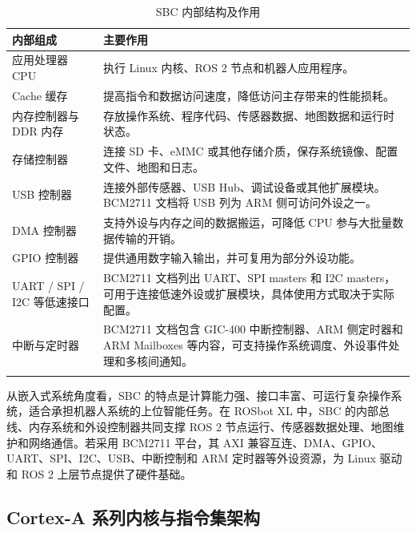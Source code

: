 \documentclass[UTF8,a4paper,12pt]{ctexrep}
\newcommand{\tabrowline}{\specialrule{0.25pt}{0pt}{0pt}}
\begin{document}
\begin{table}[H]
  \centering
  \caption{SBC 内部结构及作用}
  \label{tab:sbc-internal}
  \small
  \begin{tabularx}{\textwidth}{L{3.6cm}Y}
    \toprule
    \textbf{内部组成} & \textbf{主要作用} \\
    \midrule
    应用处理器 CPU & 执行 Linux 内核、ROS 2 节点和机器人应用程序。 \\
    \tabrowline
    Cache 缓存 & 提高指令和数据访问速度，降低访问主存带来的性能损耗。 \\
    \tabrowline
    内存控制器与 DDR 内存 & 存放操作系统、程序代码、传感器数据、地图数据和运行时状态。 \\
    \tabrowline
    存储控制器 & 连接 SD 卡、eMMC 或其他存储介质，保存系统镜像、配置文件、地图和日志。 \\
    \tabrowline
    USB 控制器 & 连接外部传感器、USB Hub、调试设备或其他扩展模块。BCM2711 文档将 USB 列为 ARM 侧可访问外设之一。 \\
    \tabrowline
    DMA 控制器 & 支持外设与内存之间的数据搬运，可降低 CPU 参与大批量数据传输的开销。 \\
    \tabrowline
    GPIO 控制器 & 提供通用数字输入输出，并可复用为部分外设功能。 \\
    \tabrowline
    UART / SPI / I2C 等低速接口 & BCM2711 文档列出 UART、SPI masters 和 I2C masters，可用于连接低速外设或扩展模块，具体使用方式取决于实际配置。 \\
    \tabrowline
    中断与定时器 & BCM2711 文档包含 GIC-400 中断控制器、ARM 侧定时器和 ARM Mailboxes 等内容，可支持操作系统调度、外设事件处理和多核间通知。 \\
    \bottomrule
  \end{tabularx}
\end{table}

从嵌入式系统角度看，SBC 的特点是计算能力强、接口丰富、可运行复杂操作系统，适合承担机器人系统的上位智能任务。在 ROSbot XL 中，SBC 的内部总线、内存系统和外设控制器共同支撑 ROS 2 节点运行、传感器数据处理、地图维护和网络通信。若采用 BCM2711 平台，其 AXI 兼容互连、DMA、GPIO、UART、SPI、I2C、USB、中断控制和 ARM 定时器等外设资源，为 Linux 驱动和 ROS 2 上层节点提供了硬件基础。

\subsection{Cortex-A 系列内核与指令集架构}
\end{document}
